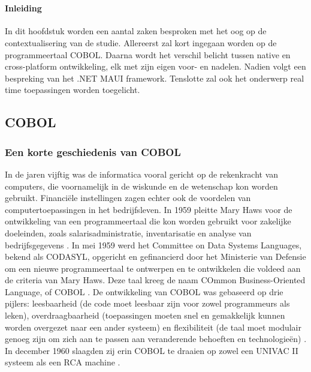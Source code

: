 \chapter{}%
\label{ch:stand-van-zaken}



\subsubsection{Inleiding}

In dit hoofdstuk worden een aantal zaken besproken met het oog op de contextualisering van de studie. Allereerst zal kort ingegaan worden op de programmeertaal COBOL. Daarna wordt het verschil belicht tussen native en cross-platform ontwikkeling, elk met zijn eigen voor- en nadelen. Nadien volgt een bespreking van het .NET MAUI framework. Tenslotte zal ook het onderwerp real time toepassingen worden toegelicht.

\section{COBOL}
\subsection{Een korte geschiedenis van COBOL}
In de jaren vijftig was de informatica vooral gericht op de rekenkracht van computers, die voornamelijk in de wiskunde en de wetenschap kon worden gebruikt. Financiële instellingen zagen echter ook de voordelen van computertoepassingen in het bedrijfsleven. In 1959 pleitte Mary Haws voor de ontwikkeling van een programmeertaal die kon worden gebruikt voor zakelijke doeleinden, zoals salarisadministratie, inventarisatie en analyse van bedrijfsgegevens \autocite{NMAH2013}.
In mei 1959 werd het Committee on Data Systems Languages, bekend als CODASYL, opgericht en gefinancierd door het Ministerie van Defensie om een nieuwe programmeertaal te ontwerpen en te ontwikkelen die voldeed aan de criteria van Mary Haws. Deze taal kreeg de naam COmmon Business-Oriented Language, of COBOL \autocite{Abby2023}.
De ontwikkeling van COBOL was gebaseerd op drie pijlers: leesbaarheid (de code moet leesbaar zijn voor zowel programmeurs als leken), overdraagbaarheid (toepassingen moeten snel en gemakkelijk kunnen worden overgezet naar een ander systeem) en flexibiliteit (de taal moet modulair genoeg zijn om zich aan te passen aan veranderende behoeften en technologieën) \autocite{Abby2023}.
In december 1960 slaagden zij erin COBOL te draaien op zowel een UNIVAC II systeem als een RCA machine \autocite{NMAH2013}.

